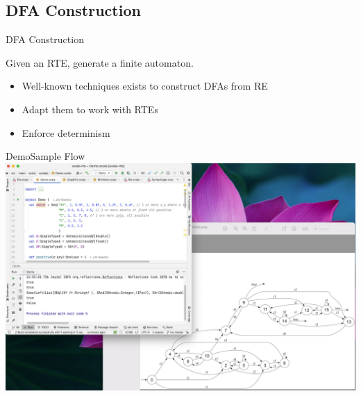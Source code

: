 \subsection{DFA Construction}

{  
\begin{frame}{ DFA Construction}

  Given an RTE, generate a finite automaton.

  \begin{itemize}
  \item Well-known techniques exists to construct DFAs from RE
  \item Adapt them to work with RTEs
  \item Enforce determinism
  \end{itemize}
\end{frame}

}






\begin{frame}{Demo}{Sample Flow}
  \centering
   \includegraphics[height=0.8\textheight]{demo.png}
\end{frame}


